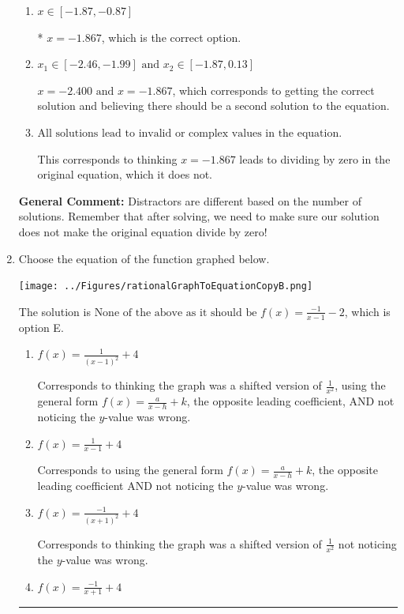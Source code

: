 \documentclass{extbook}[14pt]
\newcommand{\litem}[1]{\item #1

\rule{\textwidth}{0.4pt}}
\begin{document}
\begin{enumerate}
{\begin{enumerate}[label=\Alph*.]
$x = -1.867 \text{ and } x = 2.800$, which corresponds to getting the correct solution and believing there should be a second solution to the equation.
\item \( x \in [-1.87,-0.87] \)

* $x = -1.867$, which is the correct option.
\item \( x_1 \in [-2.46, -1.99] \text{ and } x_2 \in [-1.87,0.13] \)

$x = -2.400 \text{ and } x = -1.867$, which corresponds to getting the correct solution and believing there should be a second solution to the equation.
\item \( \text{All solutions lead to invalid or complex values in the equation.} \)

This corresponds to thinking $x = -1.867$ leads to dividing by zero in the original equation, which it does not.
\end{enumerate}

\textbf{General Comment:} Distractors are different based on the number of solutions. Remember that after solving, we need to make sure our solution does not make the original equation divide by zero!
}
\litem{
Choose the equation of the function graphed below.

\begin{center}
    \texttt{[image: ../Figures/rationalGraphToEquationCopyB.png]}
\end{center}


The solution is \( \text{None of the above as it should be } f(x) = \frac{-1}{x - 1} - 2 \), which is option E.\begin{enumerate}[label=\Alph*.]
\item \( f(x) = \frac{1}{(x - 1)^2} + 4 \)

Corresponds to thinking the graph was a shifted version of $\frac{1}{x^2}$, using the general form $f(x) = \frac{a}{x-h}+k$, the opposite leading coefficient, AND not noticing the $y$-value was wrong.
\item \( f(x) = \frac{1}{x - 1} + 4 \)

Corresponds to using the general form $f(x) = \frac{a}{x-h}+k$, the opposite leading coefficient AND not noticing the $y$-value was wrong.
\item \( f(x) = \frac{-1}{(x + 1)^2} + 4 \)

Corresponds to thinking the graph was a shifted version of $\frac{1}{x^2}$ not noticing the $y$-value was wrong.
\item \( f(x) = \frac{-1}{x + 1} + 4 \)


\end{enumerate}}
\end{enumerate}
\end{document}
